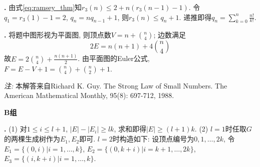 \par \textbf{\thesolgraph .} 由式\ref{eq:ramsey_thm}知$r_3(n)\le 2+n(r_3(n-1)-1)$. 令$q_1=r_3(1)-1=2$, $q_n = nq_{n-1}+1$, 则$r_3(n) \le q_n+1$. 递推即得$q_n = \sum_{k=0}^n \frac{n!}{k!}$. 

\par \textbf{\thesolgraph .} 将题中图形视为平面图, 则顶点数$V=n+\binom{n}{4}$; 边数满足
\begin{equation}
    2E=n(n+1)+4\binom{n}{4}
\end{equation}
故$E=2\binom{n}{4}+\frac{n(n+1)}{2}$. 由平面图的Euler公式, $F=E-V+1=\binom{n}{4}+\binom{n}{2}+1$.
\par \emph{注:} 本解答来自Richard K. Guy. The Strong Law of Small Numbers. The American Mathematical Monthly, 95(8): 697-712, 1988. 

\textbf{B组}

\par \textbf{\thesolgraph .} (1) 对$1\le i\le l+1$, $|E|-|E_i|\ge lk$, 求和即得$|E|\ge (l+1)k$. (2) $l=1$时任取$G$的两棵生成树作为$E_1,E_2$即可. $l=2$时构造如下: 设顶点编号为$0,1,\dots, 2k$, 令$E_1=\{(0,i)|i=1,\dots, k\}$, $E_2=\{(0,k+i)|i=k+1,\dots, 2k\}$,  $E_3=\{(i,k+i)|i=1,\dots, k\}$. 